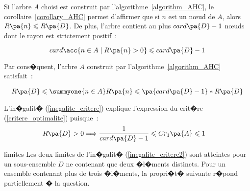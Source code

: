 Si l'arbre $A$ choisi est construit par l'algorithme~\ref{algorithm_AHC}, le corollaire~\ref{corollary_AHC} permet d'affirmer que si $n$ est un n\oe ud de $A$, alors $R\pa{n} \leqslant R\pa{D}$. De plus, l'arbre contient au plus $card\pa{D}-1$ n\oe uds dont le rayon est strictement positif~:

    $$
    card  \acc{n \in A \; | \; R \pa{n} > 0} \leqslant card\pa{D}-1
    $$

Par cons�quent, l'arbre $A$ construit par l'algorithme~\ref{algorithm_AHC} satisfait~:

    \begin{eqnarray}
    R\pa{D} \leqslant    \summyone{n \in A} R\pa{n} \leqslant \pa{card\pa{D}-1} * R\pa{D}
                     \label{inegalite_critere}
    \end{eqnarray}

L'in�galit� (\ref{inegalite_critere}) explique l'expression du crit�re (\ref{critere_optimalite}) puisque~:
    \begin{eqnarray}
    R\pa{D} > 0 \Longrightarrow \dfrac{1}{card\pa{D}-1} \leqslant    Cr_1\pa{A} \leqslant 1  &&
             \label{inegalite_critere2}
    \end{eqnarray}

\begin{xremark}{limites}
Les deux limites de l'in�galit� (\ref{inegalite_critere2}) sont atteintes pour un sous-ensemble $D$ ne contenant que deux �l�ments distincts. Pour un ensemble contenant plus de trois �l�ments, la propri�t� suivante r�pond partiellement � la question.
\end{xremark}





